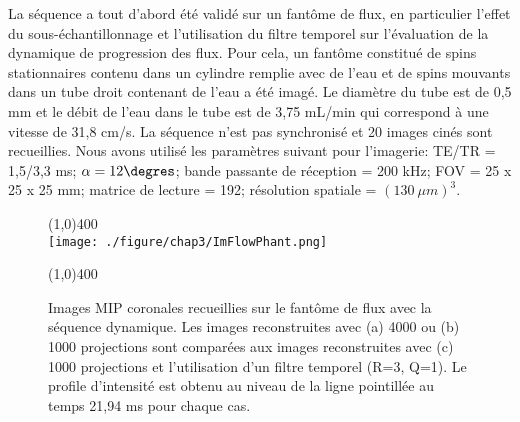 La séquence a tout d'abord été validé sur un fantôme de flux, en particulier l'effet du sous-échantillonnage et l'utilisation du filtre temporel sur l'évaluation de la dynamique de progression des flux. Pour cela, un fantôme constitué de spins stationnaires contenu dans un cylindre remplie avec de l'eau et de spins mouvants dans un tube droit contenant de l'eau a été imagé. Le diamètre du tube est de 0,5 mm et le débit de l'eau dans le tube est de 3,75 mL/min qui correspond à une vitesse de 31,8 cm/s. La séquence n'est pas synchronisé et 20 images cinés sont recueillies. Nous avons utilisé les paramètres suivant pour l'imagerie: TE/TR = 1,5/3,3 ms; $\alpha=12\degres$; bande passante de réception = 200 kHz; FOV = 25 x 25 x 25 mm; matrice de lecture = 192; résolution spatiale = $(130 \ \mu m)^3$.
\begin{figure}[H]
\centering \line(1,0){400} \\
\texttt{[image: ./figure/chap3/ImFlowPhant.png]}
\caption[Image ARM dynamique sur fantôme]{\label{fig:ImFlowPhant} Images MIP coronales recueillies sur le fantôme de flux avec la séquence dynamique. Les images reconstruites avec (a) 4000 ou (b) 1000 projections sont comparées aux images reconstruites avec (c) 1000 projections et l'utilisation d'un filtre temporel (R=3, Q=1). Le profile d'intensité est obtenu au niveau de la ligne pointillée au temps 21,94 ms pour chaque cas.}
\line(1,0){400} \\ \end{figure}

